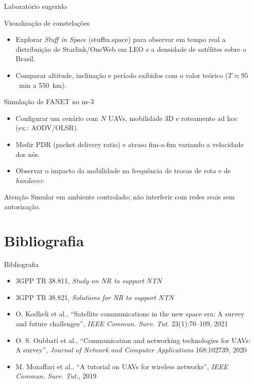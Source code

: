 \documentclass[aspectratio=169,11pt]{beamer}
\begin{document}
\begin{frame}{Laboratório sugerido}
  \begin{block}{Visualização de constelações}
    \begin{itemize}
      \item Explorar \emph{Stuff in Space} (stuffin.space) para observar em tempo real a distribuição de Starlink/OneWeb em LEO e a densidade de satélites sobre o Brasil.
      \item Comparar altitude, inclinação e período exibidos com o valor teórico ($T \approx 95$~min a 550~km).
    \end{itemize}
  \end{block}
  \begin{block}{Simulação de FANET no ns-3}
    \begin{itemize}
      \item Configurar um cenário com $N$ UAVs, mobilidade 3D e roteamento ad hoc (ex.: AODV/OLSR).
      \item Medir PDR (packet delivery ratio) e atraso fim-a-fim variando a velocidade dos nós.
      \item Observar o impacto da mobilidade na frequência de trocas de rota e de \emph{handover}.
    \end{itemize}
  \end{block}
  \begin{alertblock}{Atenção}
    Simular em ambiente controlado; não interferir com redes reais sem autorização.
  \end{alertblock}
\end{frame}

\section{Bibliografia}

\begin{frame}{Bibliografia}
  \begin{itemize}
    \item 3GPP TR 38.811, \emph{Study on NR to support NTN}
    \item 3GPP TR 38.821, \emph{Solutions for NR to support NTN}
    \item O. Kodheli et al., ``Satellite communications in the new space era: A survey and future challenges'', \emph{IEEE Commun. Surv. Tut.} 23(1):70--109, 2021
    \item O. S. Oubbati et al., ``Communication and networking technologies for UAVs: A survey'', \emph{Journal of Network and Computer Applications} 168:102739, 2020
    \item M. Mozaffari et al., ``A tutorial on UAVs for wireless networks'', \emph{IEEE Commun. Surv. Tut.}, 2019
  \end{itemize}
\end{frame}
\end{document}
